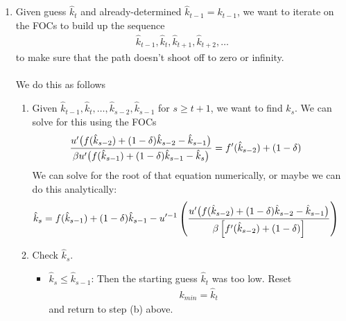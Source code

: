 \documentclass[12pt]{article}
\theoremstyle{plain}
\theoremstyle{definition}
\theoremstyle{remark}
\begin{document}
\begin{enumerate}
\begin{enumerate}
      \item Given guess $\hat{k}_t$ and already-determined
        $\hat{k}_{t-1}=k_{t-1}$, we want to iterate on the FOCs to build
        up the sequence
        \begin{align*}
          \hat{k}_{t-1},\hat{k}_t,\hat{k}_{t+1},\hat{k}_{t+2},\ldots
        \end{align*}
        to make sure that the path doesn't shoot off to zero or
        infinity.
        \\
        \\
        We do this as follows
        \begin{enumerate}
          \item Given
            $\hat{k}_{t-1},\hat{k}_t,\ldots,\hat{k}_{s-2},\hat{k}_{s-1}$
            for $s\geq t+1$, we want to find $\hat{k}_s$. We can solve
            for this using the FOCs
            \begin{align*}
              \frac{%
                u'\big(
                  f(\hat{k}_{s-2})
                  + (1-\delta)\hat{k}_{s-2} - \hat{k}_{s-1}
                \big)
              }{%
                \beta u'\big(
                f(\hat{k}_{s-1}) + (1-\delta)\hat{k}_{s-1} -
                  \hat{k}_{s}
                \big)
              }
              &= f'(\hat{k}_{s-2}) + (1-\delta)
            \end{align*}
            We can solve for the root of that equation numerically, or
            maybe we can do this analytically:
            \begin{align*}
              \hat{k}_{s}
              &= f(\hat{k}_{s-1}) + (1-\delta)\hat{k}_{s-1} -
              u'^{-1}
              \left(
                \frac{%
                  u'\big(
                  f(\hat{k}_{s-2}) + (1-\delta)\hat{k}_{s-2}
                  - \hat{k}_{s-1}
                  \big)
                }{%
                  \beta\left[
                  f'(\hat{k}_{s-2}) + (1-\delta)
                  \right]
                }
              \right)
            \end{align*}

          \item Check $\hat{k}_s$.
            \begin{itemize}
              \item $\hat{k}_s\leq \hat{k}_{s-1}$: Then the starting
                guess $\hat{k}_t$ was too low. Reset
                \begin{align*}
                  k_{min} = \hat{k}_t
                \end{align*}
                and return to step (b) above.


\end{itemize}
\end{enumerate}
\end{enumerate}
\end{enumerate}
\end{document}
